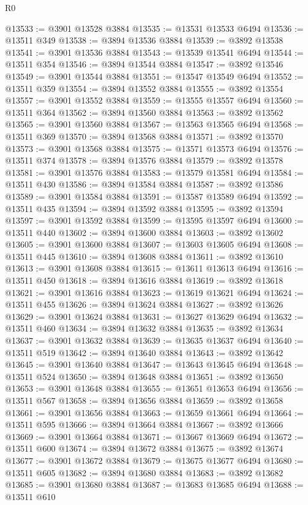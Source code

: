 \begin{lexlean}{R0}
\begin{coremodule}
@13533 := @3901 @13528 @3884
@13535 := @13531 @13533 @6494
@13536 := @13511 @349
@13538 := @3894 @13536 @3884
@13539 := @3892 @13538
@13541 := @3901 @13536 @3884
@13543 := @13539 @13541 @6494
@13544 := @13511 @354
@13546 := @3894 @13544 @3884
@13547 := @3892 @13546
@13549 := @3901 @13544 @3884
@13551 := @13547 @13549 @6494
@13552 := @13511 @359
@13554 := @3894 @13552 @3884
@13555 := @3892 @13554
@13557 := @3901 @13552 @3884
@13559 := @13555 @13557 @6494
@13560 := @13511 @364
@13562 := @3894 @13560 @3884
@13563 := @3892 @13562
@13565 := @3901 @13560 @3884
@13567 := @13563 @13565 @6494
@13568 := @13511 @369
@13570 := @3894 @13568 @3884
@13571 := @3892 @13570
@13573 := @3901 @13568 @3884
@13575 := @13571 @13573 @6494
@13576 := @13511 @374
@13578 := @3894 @13576 @3884
@13579 := @3892 @13578
@13581 := @3901 @13576 @3884
@13583 := @13579 @13581 @6494
@13584 := @13511 @430
@13586 := @3894 @13584 @3884
@13587 := @3892 @13586
@13589 := @3901 @13584 @3884
@13591 := @13587 @13589 @6494
@13592 := @13511 @435
@13594 := @3894 @13592 @3884
@13595 := @3892 @13594
@13597 := @3901 @13592 @3884
@13599 := @13595 @13597 @6494
@13600 := @13511 @440
@13602 := @3894 @13600 @3884
@13603 := @3892 @13602
@13605 := @3901 @13600 @3884
@13607 := @13603 @13605 @6494
@13608 := @13511 @445
@13610 := @3894 @13608 @3884
@13611 := @3892 @13610
@13613 := @3901 @13608 @3884
@13615 := @13611 @13613 @6494
@13616 := @13511 @450
@13618 := @3894 @13616 @3884
@13619 := @3892 @13618
@13621 := @3901 @13616 @3884
@13623 := @13619 @13621 @6494
@13624 := @13511 @455
@13626 := @3894 @13624 @3884
@13627 := @3892 @13626
@13629 := @3901 @13624 @3884
@13631 := @13627 @13629 @6494
@13632 := @13511 @460
@13634 := @3894 @13632 @3884
@13635 := @3892 @13634
@13637 := @3901 @13632 @3884
@13639 := @13635 @13637 @6494
@13640 := @13511 @519
@13642 := @3894 @13640 @3884
@13643 := @3892 @13642
@13645 := @3901 @13640 @3884
@13647 := @13643 @13645 @6494
@13648 := @13511 @524
@13650 := @3894 @13648 @3884
@13651 := @3892 @13650
@13653 := @3901 @13648 @3884
@13655 := @13651 @13653 @6494
@13656 := @13511 @567
@13658 := @3894 @13656 @3884
@13659 := @3892 @13658
@13661 := @3901 @13656 @3884
@13663 := @13659 @13661 @6494
@13664 := @13511 @595
@13666 := @3894 @13664 @3884
@13667 := @3892 @13666
@13669 := @3901 @13664 @3884
@13671 := @13667 @13669 @6494
@13672 := @13511 @600
@13674 := @3894 @13672 @3884
@13675 := @3892 @13674
@13677 := @3901 @13672 @3884
@13679 := @13675 @13677 @6494
@13680 := @13511 @605
@13682 := @3894 @13680 @3884
@13683 := @3892 @13682
@13685 := @3901 @13680 @3884
@13687 := @13683 @13685 @6494
@13688 := @13511 @610

\end{coremodule}
\end{lexlean}
